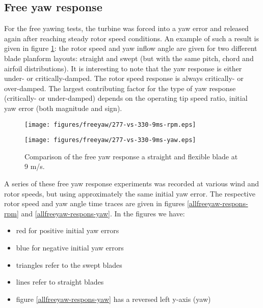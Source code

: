 \documentclass[a4paper]{jpconf}
\begin{document}
\subsection{Free yaw response}

For the free yawing tests, the turbine was forced into a yaw error and released again after reaching steady rotor speed conditions. An example of such a result is given in figure \ref{freeyaw-flex-vs-samo}: the rotor speed and yaw inflow angle are given for two different blade planform layouts: straight and swept (but with the same pitch, chord and airfoil distributions). It is interesting to note that the yaw response is either under- or critically-damped. The rotor speed response is always critically- or over-damped. The largest contributing factor for the type of yaw response (critically- or under-damped) depends on the operating tip speed ratio, initial yaw error (both magnitude and sign).

\begin{figure}[h]
\centering
\begin{minipage}{\textwidth}
\centering
\texttt{[image: figures/freeyaw/277-vs-330-9ms-rpm.eps]}
\end{minipage}
\begin{minipage}{\textwidth}
\centering
\texttt{[image: figures/freeyaw/277-vs-330-9ms-yaw.eps]}
\caption{\label{freeyaw-flex-vs-samo} Comparison of the free yaw response a straight and flexible blade at 9 m/s.}
\end{minipage} 
\end{figure}

A series of these free yaw response experiments was recorded at various wind and rotor speeds, but using approximately the same initial yaw error. The respective rotor speed and yaw angle time traces are given in figures \ref{allfreeyaw-respons-rpm} and \ref{allfreeyaw-respons-yaw}. In the figures we have:
\begin{itemize}
	\item red for positive initial yaw errors
	\item blue for negative initial yaw errors
	\item triangles refer to the swept blades
	\item lines refer to straight blades
	\item figure \ref{allfreeyaw-respons-yaw} has a reversed left y-axis (yaw)
\end{itemize}
\end{document}
